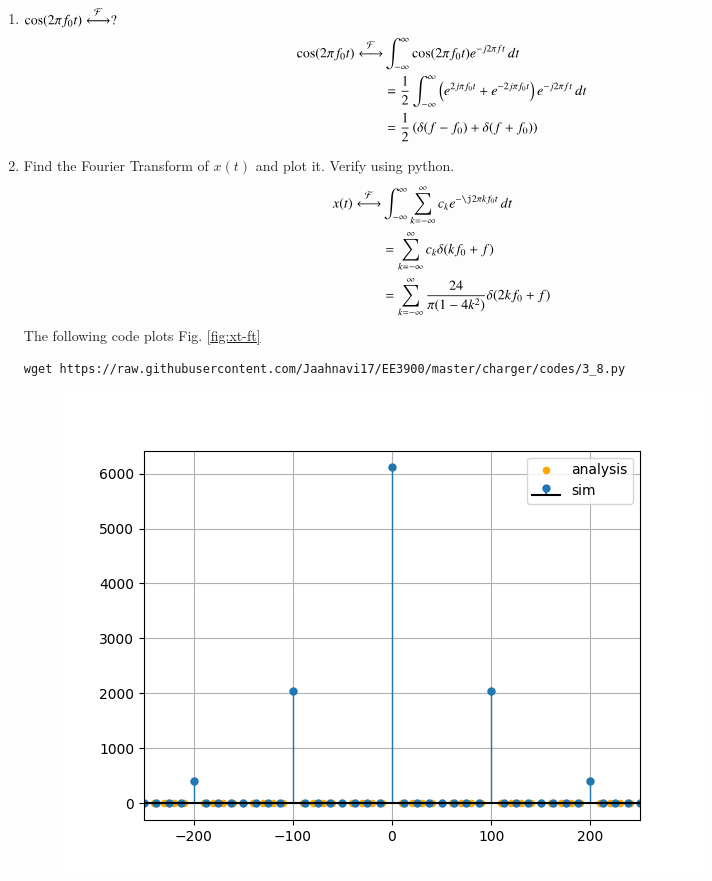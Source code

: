 \documentclass[journal,12pt,twocolumn]{IEEEtran}
\renewcommand\thesection{\arabic{section}}
\begin{document}
\begin{enumerate}[label=\thesection.\arabic*
,ref=\thesection.\theenumi]
 \begin{align}
     e^{-j2\pi f_0t}\system{F}&\int _{-\infty}^{\infty} e^{-j2\pi f_0t}e^{-j2\pi ft}\,dt\\
     &= \int _{-\infty}^{\infty} e^{-j2\pi \brak{f+f_0}t}\,dt\\
     &= \delta(f+f_0)
 \end{align}
 \item $\cos(2\pi f_0t)\overset{\mathcal{F}}{ \longleftrightarrow}?$\\\solution
 \begin{align}
     \cos(2\pi f_0t)\overset{\mathcal{F}}{ \longleftrightarrow}&\int_{-\infty}^{\infty} \cos(2\pi f_0t)e^{-j2\pi ft}\,dt\\
     &= \frac{1}{2}\int_{-\infty}^{\infty} \left(e^{2j\pi f_0t}+e^{-2j\pi f_0t}\right)e^{-j2\pi ft}\,dt\\
     &= \frac{1}{2}\left(\delta(f-f_0) +\delta(f+f_0)\right)
 \end{align}
 \item Find the Fourier Transform of $x(t)$ and plot it.  Verify using python.\\\solution
 \begin{align}
     x(t)\system{F}&\int_{-\infty}^\infty\sum_{k=-\infty}^\infty c_k e^{-\j2\pi kf_0t}\,dt\\
     &= \sum_{k=-\infty}^\infty c_k \delta(kf_0+f)\\
     &= \sum_{k=-\infty}^\infty \frac{24}{\pi(1-4k^2)}\delta(2kf_0+f)
 \end{align}
 The following code plots Fig. \ref{fig:xt-ft}
	\begin{lstlisting}
wget https://raw.githubusercontent.com/Jaahnavi17/EE3900/master/charger/codes/3_8.py
\end{lstlisting}
	\begin{figure}[h!]
	    \centering
	    \includegraphics[width=\columnwidth]{figures/xt-ft.png}

\end{figure}
\end{enumerate}
\end{document}

